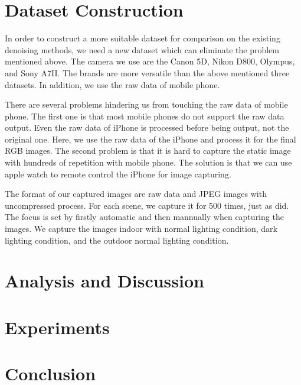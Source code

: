 \section{Dataset Construction}

In order to construct a more suitable dataset for comparison on the existing denoising methods, we need a new dataset which can eliminate the problem mentioned above. The camera we use are the Canon 5D, Nikon D800, Olympus, and Sony A7II. The brands are more versatile than the above mentioned three datasets. In addition, we use the raw data of mobile phone. 

There are several problems hindering us from touching the raw data of mobile phone. The first one is that most mobile phones do not support the raw data output. Even the raw data of  iPhone is processed before being output, not the original one. Here, we use the raw data of the iPhone and process it for the final RGB images. The second problem is that it is hard to capture the static image with hundreds of repetition with mobile phone. The solution is that we can use apple watch to remote control the iPhone for image capturing. 

The format of our captured images are raw data and JPEG images with uncompressed process. For each scene, we capture it for 500 times, just as \cite{crosschannel} did. The focus is set by firstly automatic and then mannually when capturing the images. We capture the images indoor with normal lighting condition, dark lighting condition, and the outdoor normal lighting condition.


\section{Analysis and Discussion}


\section{Experiments}










\section{Conclusion}